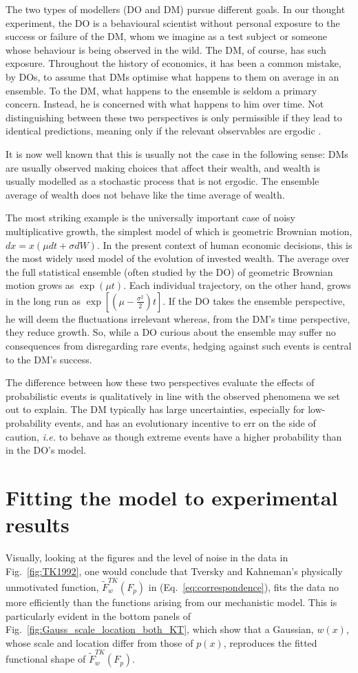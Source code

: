\documentclass[a4paper, 12pt]{article}
\newcommand{\eref}[1]{(Eq.~\ref{eq:#1})}
\newcommand{\fref}[1]{Fig.~\ref{fig:#1}}
\newcommand{\seclabel}[1]{\label{sec:#1}}
\newcommand{\ie}{\textit{i.e.}\xspace}
\begin{document}
The two types of modellers (DO and DM) pursue different goals. In our thought experiment, the DO is a behavioural scientist without personal exposure to the success or failure of the DM, whom we imagine as a test subject or someone whose behaviour is being observed in the wild. The DM, of course, has such exposure. Throughout the history of economics, it has been a common mistake, by DOs, to assume that DMs optimise what happens to them on average in an ensemble. To the DM, what happens to the ensemble is seldom a primary concern. Instead, he is concerned with what happens to him over time. Not distinguishing between these two perspectives is only permissible if they lead to identical predictions, meaning only if the relevant observables are ergodic \parencite{Peters2019b}.

It is now well known that this is usually not the case in the following sense: DMs are usually observed making choices that affect their wealth, and wealth is usually modelled as a stochastic process that is not ergodic. The ensemble average of wealth does not behave like the time average of wealth.

The most striking example is the universally important case of noisy multiplicative growth, the simplest model of which is geometric Brownian motion, $dx=x(\mu dt+\sigma dW)$. In the present context of human economic decisions, this is the most widely used model of the evolution of invested wealth. The average over the full statistical ensemble (often studied by the DO) of geometric Brownian motion grows as $\exp(\mu t)$. Each individual trajectory, on the other hand, grows in the long run as $\exp[(\mu-\frac{\sigma^2}{2})t]$. If the DO takes the ensemble perspective, he will deem the fluctuations irrelevant whereas, from the DM's time perspective, they reduce growth. So, while a DO curious about the ensemble may suffer no consequences from disregarding rare events, hedging against such events is central to the DM's success.

The difference between how these two perspectives evaluate the effects of probabilistic events is qualitatively in line with the observed phenomena we set out to explain. The DM typically has large uncertainties, especially for low-probability events, and has an evolutionary incentive to err on the side of caution, \ie to behave as though extreme events have a higher probability than in the DO's model.

\section{Fitting the model to experimental results \seclabel{Fitting_the}}
Visually, looking at the figures and the level of noise in the data in \fref{TK1992}, one would conclude that Tversky and Kahneman's physically unmotivated function, $\tilde{F}^{TK}_w(F_p)$ in \eref{correspondence}, fits the data no more efficiently than the functions arising from our mechanistic model. This is particularly evident in the bottom panels of \fref{Gauss_scale_location_both_KT}, which show that a Gaussian, $w(x)$, whose scale and location differ from those of $p(x)$, reproduces the fitted functional shape of $\tilde{F}^{TK}_w(F_p)$.
\end{document}

